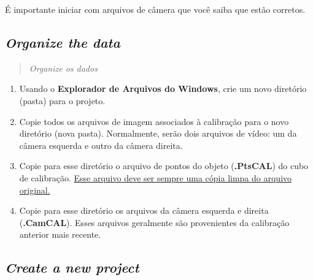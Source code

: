 \documentclass[
  12pt,
  letterpaper,
  DIV=11,
  numbers=noendperiod]{scrreprt}
\begin{document}
\begin{tcolorbox}[enhanced jigsaw, opacityback=0, colback=white, colframe=quarto-callout-caution-color-frame, left=2mm, leftrule=.75mm, toprule=.15mm, rightrule=.15mm, breakable, arc=.35mm, bottomrule=.15mm]
\begin{minipage}[t]{5.5mm}
\textcolor{quarto-callout-caution-color}{\faFire}
\end{minipage}%
\begin{minipage}[t]{\textwidth - 5.5mm}

É importante iniciar com arquivos de câmera que você saiba que estão
corretos.

\end{minipage}%
\end{tcolorbox}

\subsection{\texorpdfstring{\emph{Organize the
data}}{Organize the data}}\label{organize-the-data-1}

\begin{quote}
\emph{Organize os dados}
\end{quote}

\begin{enumerate}
\def\labelenumi{\arabic{enumi}.}
\item
  Usando o \textbf{Explorador de Arquivos do Windows}, crie um novo
  diretório (pasta) para o projeto.
\item
  Copie todos os arquivos de imagem associados à calibração para o novo
  diretório (nova pasta). Normalmente, serão dois arquivos de vídeo: um
  da câmera esquerda e outro da câmera direita.
\item
  Copie para esse diretório o arquivo de pontos do objeto
  (\textbf{.PtsCAL}) do cubo de calibração. \ul{Esse arquivo deve ser
  sempre uma cópia limpa do arquivo original.}
\item
  Copie para esse diretório os arquivos da câmera esquerda e direita
  (\textbf{.CamCAL}). Esses arquivos geralmente são provenientes da
  calibração anterior mais recente.
\end{enumerate}

\subsection{\texorpdfstring{\emph{Create a new
project}}{Create a new project}}\label{create-a-new-project-1}
\end{document}
